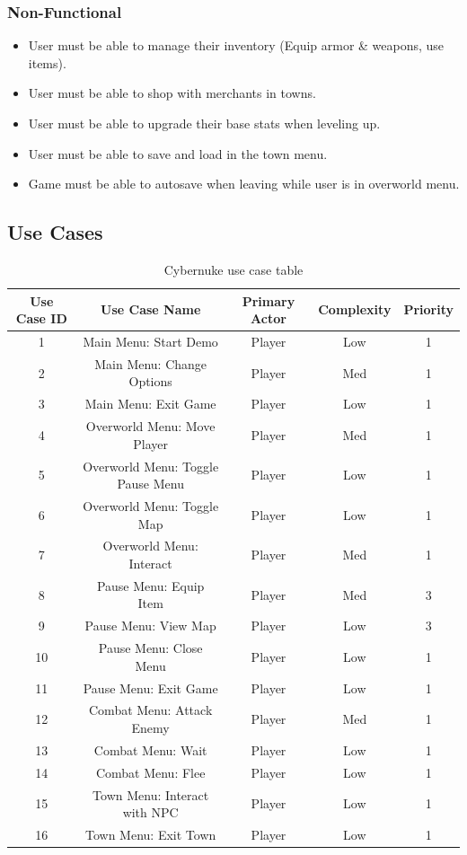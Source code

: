 \documentclass[10pt,conference,onecolumn,compsoc]{IEEEtran}
\begin{document}
\subsubsection{Non-Functional}
\begin{itemize}
\item User must be able to manage their inventory (Equip armor \& weapons, use items).
\item User must be able to shop with merchants in towns.
\item User must be able to upgrade their base stats when leveling up.
\item User must be able to save and load in the town menu.
\item Game must be able to autosave when leaving while user is in overworld menu.
\end{itemize}

\subsection{Use Cases}
\begin{table}
\centering
\begin{tabular}{|c|c|c|c|c|}
\hline
Use Case ID & Use Case Name & Primary Actor & Complexity & Priority \\
\hline \hline
1 & Main Menu: Start Demo & Player & Low & 1\\
\hline
2 & Main Menu: Change Options & Player & Med & 1\\
\hline
3 & Main Menu: Exit Game & Player & Low & 1\\
\hline
4 & Overworld Menu: Move Player & Player & Med & 1\\
\hline
5 & Overworld Menu: Toggle Pause Menu & Player & Low & 1\\
\hline
6 & Overworld Menu: Toggle Map & Player & Low & 1\\
\hline
7 & Overworld Menu: Interact & Player & Med & 1\\
\hline
8 & Pause Menu: Equip Item & Player & Med & 3\\
\hline
9 & Pause Menu: View Map & Player & Low & 3\\
\hline
10 & Pause Menu: Close Menu & Player & Low & 1\\
\hline
11 & Pause Menu: Exit Game & Player & Low & 1\\
\hline
12 & Combat Menu: Attack Enemy & Player & Med & 1\\
\hline
13 & Combat Menu: Wait & Player & Low & 1\\
\hline
14 & Combat Menu: Flee & Player & Low & 1\\
\hline
15 & Town Menu: Interact with NPC & Player & Low & 1\\
\hline
16 & Town Menu: Exit Town & Player & Low & 1\\
\hline

\end{tabular}
\caption{Cybernuke use case table}
\label{tab:useCaseIndex}
\end{table}
\end{document}
